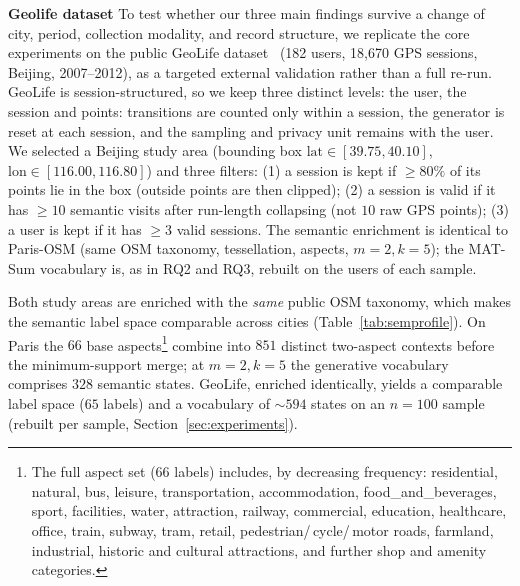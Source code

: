 \documentclass[sigconf,nonacm]{acmart}
\begin{document}
\textbf{Geolife dataset}
To test whether our three main findings survive a change of city, period, collection modality, and
record structure, we replicate the core experiments on the public GeoLife dataset~\cite{geolife}
(182 users, 18{,}670 GPS sessions, Beijing, 2007--2012), as a targeted external validation
rather than a full re-run. GeoLife is session-structured, so we keep three distinct levels: the user,
the session and points: transitions are
counted only within a session, the generator is reset at each session, and the sampling and privacy unit remains with the user. 
We selected a Beijing study area
(bounding box $\mathrm{lat}\in[39.75,40.10]$, $\mathrm{lon}\in[116.00,116.80]$) and three filters: (1) a session is kept if $\ge80\%$ of its points lie in the box (outside points are then clipped); (2) a session is valid if it has $\ge10$ semantic visits after run-length collapsing (not $10$ raw GPS
points); (3) a user is kept if it has $\ge3$ valid sessions. The semantic enrichment is identical to Paris-OSM (same OSM taxonomy, tessellation, aspects, $m{=}2,k{=}5$); the MAT-Sum vocabulary is, as in RQ2 and RQ3, rebuilt on the users of each sample.


Both study areas are enriched with the \emph{same} public OSM taxonomy, which makes the semantic label
space comparable across cities (Table~\ref{tab:semprofile}). On Paris the $66$ base aspects\footnote{The full aspect set (66 labels) includes, by decreasing frequency: residential, natural, bus, leisure, transportation, accommodation, food\_and\_beverages, sport, facilities, water, attraction, railway, commercial, education, healthcare, office, train, subway, tram, retail, pedestrian/\,cycle/\,motor roads, farmland, industrial, historic and cultural attractions, and further shop and amenity categories.} combine into
$851$ distinct two-aspect contexts before the minimum-support merge; at $m{=}2,k{=}5$ the generative
vocabulary comprises $328$ semantic states. GeoLife, enriched identically, yields a comparable label
space ($65$ labels) and a vocabulary of $\sim\!594$ states on an $n{=}100$ sample (rebuilt per sample,
Section~\ref{sec:experiments}).
\end{document}
